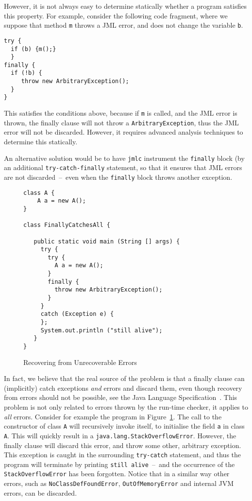 \documentclass[]{llncs}
\begin{document}
However, it is not always easy to determine statically whether a
program satisfies this property. For example, consider the following
code fragment, where we suppose that method \texttt{m} throws a JML
error, and does not change the variable \texttt{b}.
\begin{verbatim}
try {	
  if (b) {m();}
  }	
finally {
  if (!b) {
     throw new ArbitraryException();
  }
}
\end{verbatim}
This satisfies the conditions above, because if \texttt{m} is called,
and the JML error is thrown, the finally clause will not throw a
\texttt{ArbitraryException}, thus the JML error will not be
discarded. However, it requires advanced analysis techniques to
determine this statically.

An alternative solution would be to have \texttt{jmlc} instrument the
\texttt{finally} block (by an additional \texttt{try-catch-finally}
statement, so that it ensures that JML errors are not
discarded~--~even when the \texttt{finally} block throws another
exception.

\begin{figure}[t]
\begin{verbatim}
class A {
    A a = new A();
}

class FinallyCatchesAll {

   public static void main (String [] args) {
     try {
       try { 
         A a = new A();
       }
       finally {
         throw new ArbitraryException();
       }
     }
     catch (Exception e) {
     };
     System.out.println ("still alive");
   }
}
\end{verbatim}
\caption{Recovering from Unrecoverable Errors}\label{FigStackOverflow}
\end{figure}

In fact, we believe that the real source of the problem is that a
finally clause can (implicitly) catch exceptions \emph{and} errors and
discard them, even though recovery from errors should not be possible,
see the Java Language Specification~\cite[\S 11.5]{GoslingJSB05}. This
problem is not only related to errors thrown by the run-time checker,
it applies to \emph{all} errors. Consider for example the program in
Figure~\ref{FigStackOverflow}. The call to the constructor of class
\texttt{A} will recursively invoke itself, to initialise the
field \texttt{a} in class \texttt{A}. This will quickly result in a
\texttt{java.lang.StackOverflowError}. However, the finally clause
will discard this error, and throw some other, arbitrary
exception. This exception is caught in the surrounding
\texttt{try-catch} statement, and thus the program will terminate by
printing \texttt{still alive}~--~and the occurrence of the
\texttt{StackOverflowError} has been forgotten. Notice that in a
similar way other errors, such as \texttt{NoClassDefFoundError}, 
\texttt{OutOfMemoryError} and internal JVM errors, can be
discarded.
\end{document}

